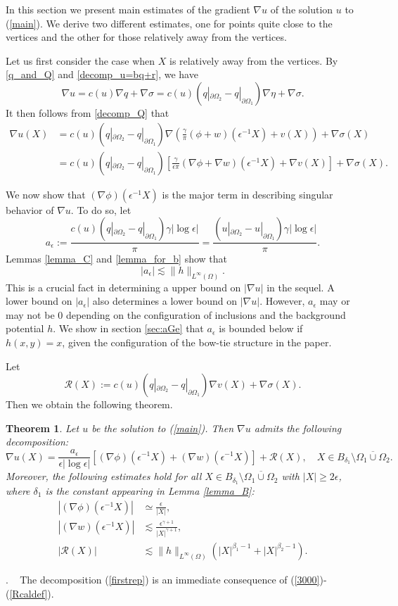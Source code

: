 \documentclass[11pt,a4paper]{article}
\numberwithin{equation}{section}
\newtheorem{thm}{Theorem}[section]
\newcommand{\pf}{\noindent {\sl Proof}. \ }
\newcommand{\p}{\partial}
\newcommand{\norm}[1]{\| #1 \|}
\newcommand{\eqnref}[1]{(\ref {#1})}
\newcommand{\Rcal}{\mathcal{R}}
\newcommand{\Gb}{\beta}
\newcommand{\Gd}{\delta}
\newcommand{\Ge}{\epsilon}
\newcommand{\Gf}{\phi}
\newcommand{\Gg}{\gamma}
\newcommand{\Gn}{\eta}
\newcommand{\Gs}{\sigma}
\newcommand{\GO}{\Omega}
\newcommand{\beq}{\begin{equation}}
\newcommand{\eeq}{\end{equation}}
\begin{document}
In this section we present main estimates of the gradient $\nabla u$ of the solution $u$ to \eqnref{main}. We derive two different estimates, one for points quite close to the vertices and the other for those relatively away from the vertices.

Let us first consider the case when $X$ is relatively away from the vertices.
By \eqref{q_and_Q} and \eqref{decomp_u=bq+r}, we have
$$
\nabla u = c(u) \nabla q+ \nabla \Gs = c(u) (q |_{\p\GO_2} - q|_{\p\GO_1}) \nabla \Gn + \nabla \Gs.
$$
It then follows from \eqref{decomp_Q} that
\begin{align}
\nabla u (X) &= c(u) (q |_{\p \GO_2} - q|_{\p \GO_1}) \nabla \left( \frac{\Gg}{\pi} ( \Gf + w ) (\Ge^{-1} X) + v (X) \right) + \nabla \Gs (X) \nonumber \\
&= c(u) (q |_{\p \GO_2} - q|_{\p \GO_1}) \left[ \frac{\Gg}{\Ge\pi} ( \nabla \Gf + \nabla w ) (\Ge^{-1} X) + \nabla v (X) \right] + \nabla \Gs (X). \label{3000}
\end{align}


We now show that $(\nabla \Gf) (\Ge^{-1} X)$ is the major term in describing singular behavior of $\nabla u$. To do so, let
\beq\label{aGedef}
a_\Ge := \frac{c(u) (q |_{\p \GO_2} - q|_{\p \GO_1})\Gg |\log \Ge|}{\pi} = \frac{(u |_{\p \GO_2} - u|_{\p \GO_1})\Gg |\log \Ge|}{\pi}.
\eeq
Lemmas \ref{lemma_C} and \ref{lemma_for_b} show that
\beq\label{aGe}
|a_{\Ge}| \lesssim \norm{h}_{L^{\infty}(\GO)}.
\eeq
This is a crucial fact in determining a upper bound on $|\nabla u|$ in the sequel. A lower bound on $|a_{\Ge}|$ also determines a lower bound on $|\nabla u|$. However, $a_\Ge$ may or may not be $0$ depending on the configuration of inclusions and the background potential $h$. We show in section \ref{sec:aGe} that $a_\Ge$ is bounded below if $h(x,y)=x$, given the configuration of the bow-tie structure in the paper.


Let
\beq\label{Rcaldef}
\Rcal(X) := c(u) (q |_{\p \GO_2} - q|_{\p \GO_1})  \nabla v(X)+ \nabla \Gs(X).
\eeq
Then we obtain the following theorem.


\begin{thm}\label{1st_thm_two}
Let $u$ be the solution to \eqnref{main}. Then $\nabla u$ admits the following decomposition:
\beq\label{firstrep}
\nabla u (X)= \frac{a_\Ge}{\Ge |\log \Ge|} \left[ (\nabla\Gf)(\Ge^{-1} X) + (\nabla w ) (\Ge^{-1} X) \right] + \Rcal(X), \quad  X \in B_{\Gd_1} \setminus \overline{ \GO_1 \cup \GO_2}.
\eeq
Moreover, the following estimates hold for all $X \in B_{\Gd_1} \setminus \overline{ \GO_1 \cup \GO_2}$ with $|X| \ge 2\Ge$, where $\Gd_1$ is the constant appearing in Lemma \ref{lemma_B}:
\begin{align}
|(\nabla\Gf)(\Ge^{-1} X)| &\simeq \frac{\Ge}{|X|}, \label{2002} \\
|(\nabla w)(\Ge^{-1}X) | &\lesssim \frac{\Ge^{\Gg+1}}{|X|^{{\Gg}+1}}, \label{2001} \\
| \Rcal(X) | &\lesssim \norm{h}_{L^{\infty} (\GO)} (|X|^{\Gb_1-1} + |X|^{\Gb_2-1}). \label{2000}
\end{align}
\end{thm}
\pf
The decomposition \eqnref{firstrep} is an immediate consequence of \eqnref{3000}-\eqnref{Rcaldef}.
\end{document}
